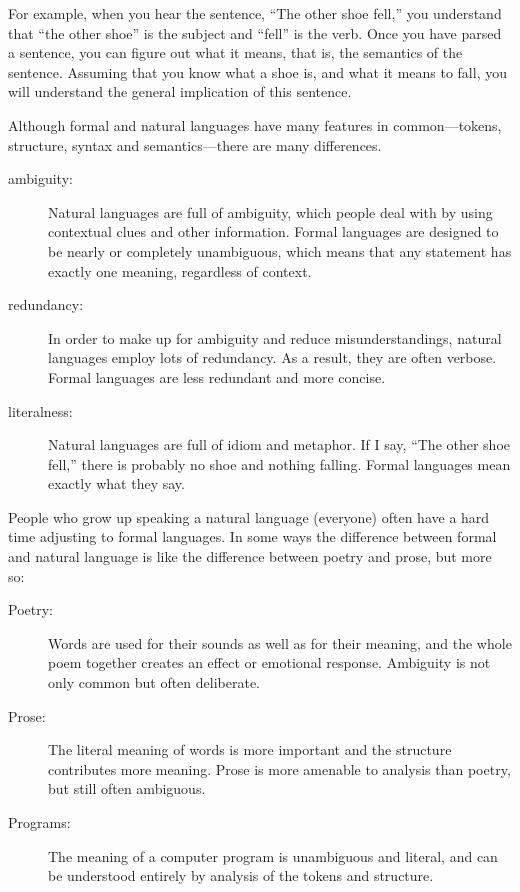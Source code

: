 
For example, when you hear the sentence, ``The other shoe fell,'' you
understand that ``the other shoe'' is the subject and ``fell'' is the
verb.  Once you have parsed a sentence, you can figure out what it
means, that is, the semantics of the sentence.  Assuming that you know
what a shoe is, and what it means to fall, you will understand the
general implication of this sentence.

Although formal and natural languages have many features in
common---tokens, structure, syntax and semantics---there are many
differences.


\begin{description}

\item[ambiguity:] Natural languages are full of ambiguity, which
people deal with by using contextual clues and other information.
Formal languages are designed to be nearly or completely unambiguous,
which means that any statement has exactly one meaning,
regardless of context.

\item[redundancy:] In order to make up for ambiguity and reduce
misunderstandings, natural languages employ lots of
redundancy.  As a result, they are often verbose.  Formal languages
are less redundant and more concise.

\item[literalness:] Natural languages are full of idiom and
metaphor.  If I say, ``The other shoe fell,'' there is probably
no shoe and nothing falling.  Formal languages mean
exactly what they say.

\end{description}

People who grow up speaking a natural language (everyone) often have a
hard time adjusting to formal languages.  In some ways the difference
between formal and natural language is like the difference between
poetry and prose, but more so:


\begin{description}

\item[Poetry:] Words are used for their sounds as well as for
their meaning, and the whole poem together creates an effect or
emotional response.  Ambiguity is not only common but often
deliberate.

\item[Prose:] The literal meaning of words is more important
and the structure contributes more meaning.  Prose is more amenable to
analysis than poetry, but still often ambiguous.

\item[Programs:] The meaning of a computer program is unambiguous
and literal, and can be understood entirely by analysis of the
tokens and structure.

\end{description}

